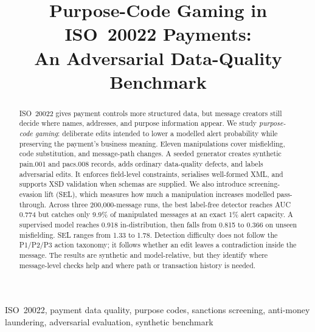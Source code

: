 \documentclass[conference]{IEEEtran}
\begin{document}
\title{Purpose-Code Gaming in ISO~20022 Payments:\\
An Adversarial Data-Quality Benchmark}
\author{
}
\maketitle
\begin{abstract}
ISO~20022 gives payment controls more structured data, but message creators
still decide where names, addresses, and purpose information appear. We study
\emph{purpose-code gaming}: deliberate edits intended to lower a modelled
alert probability while preserving the payment's business meaning. Eleven
manipulations cover misfielding, code substitution, and message-path changes.
A seeded generator creates synthetic pain.001 and pacs.008 records, adds
ordinary data-quality defects, and labels adversarial edits. It enforces
field-level constraints, serialises well-formed XML, and supports XSD
validation when schemas are supplied. We also introduce screening-evasion lift
(SEL), which measures how much a manipulation increases modelled pass-through.
Across three 200,000-message runs, the best label-free detector reaches AUC
0.774 but catches only 9.9\% of manipulated messages at an exact 1\% alert
capacity. A supervised model reaches 0.918 in-distribution, then falls from
0.815 to 0.366 on unseen misfielding. SEL ranges from 1.33 to 1.78. Detection
difficulty does not follow the P1/P2/P3 action taxonomy; it follows whether an
edit leaves a contradiction inside the message. The results are synthetic and
model-relative, but they identify where message-level checks help and where
path or transaction history is needed.
\end{abstract}
\begin{IEEEkeywords}
ISO~20022, payment data quality, purpose codes, sanctions screening,
anti-money laundering, adversarial evaluation, synthetic benchmark
\end{IEEEkeywords}
\end{document}
